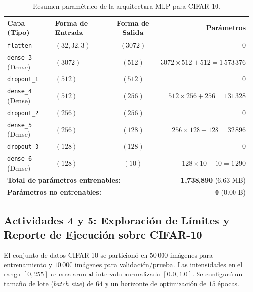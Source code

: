 \documentclass[12pt]{article}
\begin{document}
\begin{table}[H]
	\centering
	\caption{Resumen paramétrico de la arquitectura MLP para CIFAR-10.}
	\label{tab:cifar_summary}
	\vspace{0.2cm}
	\begin{tabular}{|l|l|c|r|}
		\hline
		\textbf{Capa (Tipo)} & \textbf{Forma de Entrada} & \textbf{Forma de Salida} & \textbf{Parámetros} \\ \hline
		\texttt{flatten} & $(32, 32, 3)$ & $(3072)$ & $0$ \\ \hline
		\texttt{dense\_3} (Dense) & $(3072)$ & $(512)$ & $3072 \times 512 + 512 = 1\,573\,376$ \\ \hline
		\texttt{dropout\_1} & $(512)$ & $(512)$ & $0$ \\ \hline
		\texttt{dense\_4} (Dense) & $(512)$ & $(256)$ & $512 \times 256 + 256 = 131\,328$ \\ \hline
		\texttt{dropout\_2} & $(256)$ & $(256)$ & $0$ \\ \hline
		\texttt{dense\_5} (Dense) & $(256)$ & $(128)$ & $256 \times 128 + 128 = 32\,896$ \\ \hline
		\texttt{dropout\_3} & $(128)$ & $(128)$ & $0$ \\ \hline
		\texttt{dense\_6} (Dense) & $(128)$ & $(10)$ & $128 \times 10 + 10 = 1\,290$ \\ \hline
		\hline
		\multicolumn{3}{|l|}{\textbf{Total de parámetros entrenables:}} & \textbf{1,738,890} ($6.63$ MB) \\ \hline
		\multicolumn{3}{|l|}{\textbf{Parámetros no entrenables:}} & \textbf{0} ($0.00$ B) \\ \hline
	\end{tabular}
\end{table}

\subsection{Actividades 4 y 5: Exploración de Límites y Reporte de Ejecución sobre CIFAR-10}

El conjunto de datos CIFAR-10 se particionó en $50\,000$ imágenes para entrenamiento y $10\,000$ imágenes para validación/prueba. Las intensidades en el rango $[0, 255]$ se escalaron al intervalo normalizado $[0.0, 1.0]$. Se configuró un tamaño de lote (\textit{batch size}) de $64$ y un horizonte de optimización de $15$ épocas.
\end{document}
